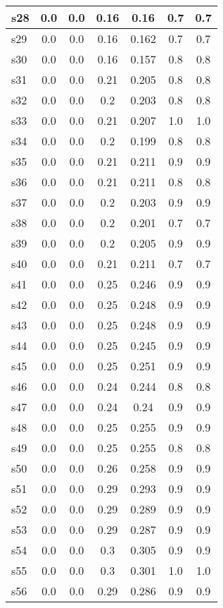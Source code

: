 \documentclass{article}
\begin{document}
\begin{tabular}{|l|c|c|c|c|c|c|}
\hline
s28 &0.0 & 0.0 & 0.16 & 0.16 & 0.7 & 0.7\\
\hline
s29 &0.0 & 0.0 & 0.16 & 0.162 & 0.7 & 0.7\\
\hline
s30 &0.0 & 0.0 & 0.16 & 0.157 & 0.8 & 0.8\\
\hline
s31 &0.0 & 0.0 & 0.21 & 0.205 & 0.8 & 0.8\\
\hline
s32 &0.0 & 0.0 & 0.2 & 0.203 & 0.8 & 0.8\\
\hline
s33 &0.0 & 0.0 & 0.21 & 0.207 & 1.0 & 1.0\\
\hline
s34 &0.0 & 0.0 & 0.2 & 0.199 & 0.8 & 0.8\\
\hline
s35 &0.0 & 0.0 & 0.21 & 0.211 & 0.9 & 0.9\\
\hline
s36 &0.0 & 0.0 & 0.21 & 0.211 & 0.8 & 0.8\\
\hline
s37 &0.0 & 0.0 & 0.2 & 0.203 & 0.9 & 0.9\\
\hline
s38 &0.0 & 0.0 & 0.2 & 0.201 & 0.7 & 0.7\\
\hline
s39 &0.0 & 0.0 & 0.2 & 0.205 & 0.9 & 0.9\\
\hline
s40 &0.0 & 0.0 & 0.21 & 0.211 & 0.7 & 0.7\\
\hline
s41 &0.0 & 0.0 & 0.25 & 0.246 & 0.9 & 0.9\\
\hline
s42 &0.0 & 0.0 & 0.25 & 0.248 & 0.9 & 0.9\\
\hline
s43 &0.0 & 0.0 & 0.25 & 0.248 & 0.9 & 0.9\\
\hline
s44 &0.0 & 0.0 & 0.25 & 0.245 & 0.9 & 0.9\\
\hline
s45 &0.0 & 0.0 & 0.25 & 0.251 & 0.9 & 0.9\\
\hline
s46 &0.0 & 0.0 & 0.24 & 0.244 & 0.8 & 0.8\\
\hline
s47 &0.0 & 0.0 & 0.24 & 0.24 & 0.9 & 0.9\\
\hline
s48 &0.0 & 0.0 & 0.25 & 0.255 & 0.9 & 0.9\\
\hline
s49 &0.0 & 0.0 & 0.25 & 0.255 & 0.8 & 0.8\\
\hline
s50 &0.0 & 0.0 & 0.26 & 0.258 & 0.9 & 0.9\\
\hline
s51 &0.0 & 0.0 & 0.29 & 0.293 & 0.9 & 0.9\\
\hline
s52 &0.0 & 0.0 & 0.29 & 0.289 & 0.9 & 0.9\\
\hline
s53 &0.0 & 0.0 & 0.29 & 0.287 & 0.9 & 0.9\\
\hline
s54 &0.0 & 0.0 & 0.3 & 0.305 & 0.9 & 0.9\\
\hline
s55 &0.0 & 0.0 & 0.3 & 0.301 & 1.0 & 1.0\\
\hline
s56 &0.0 & 0.0 & 0.29 & 0.286 & 0.9 & 0.9\\

\end{tabular}
\end{document}
